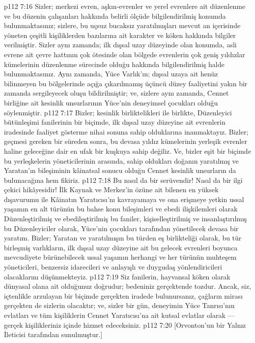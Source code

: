 \vs p112 7:16 Sizler; merkezi evren, aşkın\hyp{}evrenler ve yerel evrenlere ait düzenlenme ve bu düzenin çalışanları hakkında belirli ölçüde bilgilendirilmiş konumda bulunmaktasınız; sizlere, bu uçsuz bucaksız yaratılmışları mevcut an içerisinde yöneten çeşitli kişiliklerden bazılarına ait karakter ve köken hakkında bilgiler verilmiştir. Sizler aynı zamanda; ilk dışsal uzay düzeyinde olan konumda, asli evrene ait çevre hattının çok ötesinde olan bölgede evrenlerin çok geniş yıldızlar kümelerinin düzenlenme sürecinde olduğu hakkında bilgilendirilmiş halde bulunmaktasınız. Aynı zamanda, Yüce Varlık’ın; dışsal uzaya ait henüz bilinmeyen bu bölgelerinde açığa çıkarılmamış üçüncü düzey faaliyetini yakın bir zamanda sergileyecek oluşu bildirilmiştir; ve, sizlere aynı zamanda, Cennet birliğine ait kesinlik unsurlarının Yüce’nin deneyimsel çocukları olduğu söylenmiştir.
\vs p112 7:17 Bizler; kesinlik birliktelikleri ile birlikte, Düzenleyici bütünleşimi fanilerinin bir biçimde, ilk dışsal uzay düzeyine ait evrenlerin iradesinde faaliyet gösterme nihai sonuna sahip olduklarına inanmaktayız. Bizler; geçmesi gereken bir süreden sonra, bu devasa yıldız kümelerinin yerleşik evrenler haline geleceğine dair en ufak bir kuşkuya sahip değiliz. Ve, bizler eşit bir biçimde bu yerleşkelerin yöneticilerinin arasında, sahip oldukları doğanın yaratılmış ve Yaratan’ın bileşiminin kâinatsal sonucu olduğu Cennet kesinlik unsurların da bulunacağına hem fikiriz.
\vs p112 7:18 Bu nasıl da bir serüvendir! Nasıl da bir ilgi çekici hikâyesidir! İlk Kaynak ve Merkez’in özüne ait bilenen en yüksek dışavurumu ile Kâinatın Yaratıcısı’nı kavrayamaya ve ona erişmeye yetkin ussal yaşamın en alt türünün bu bahse konu bileşimleri ve ebedi ilişkilemleri olarak Düzenleştirilmiş ve ebedileştirilmiş bu faniler, kişiselleştirilmiş ve insanlaştırılmış bu Düzenleyiciler olarak, Yüce’nin çocukları tarafından yönetilecek devasa bir yaratım. Bizler; Yaratan ve yaratılmışın bu türden eş birlikteliği olarak, bu tür birleşmiş varlıkların, ilk dışsal uzay düzeyine ait bu gelecek evrenleri boyunca mevcudiyete bürünebilecek ussal yaşamın herhangi ve her türünün muhteşem yöneticileri, benzersiz idarecileri ve anlayışlı ve duygudaş yönlendiricileri olacaklarını düşünmekteyiz.
\vs p112 7:19 Siz fanilerin, hayvansal köken olarak dünyasal olana ait olduğunuz doğrudur; bedeniniz gerçektende tozdur. Ancak, siz, içtenlikle arzulayan bir biçimde gerçekten iradede bulunursanız, çağların mirası gerçekten de sizlerin olacaktır; ve, sizler bir gün, deneyimin Yüce Tanrısı’nın evlatları ve tüm kişiliklerin Cennet Yaratıcısı’na ait kutsal evlatlar olarak --- gerçek kişilikleriniz içinde hizmet edeceksiniz.
\vs p112 7:20 [Orvonton’un bir Yalnız İleticisi tarafından sunulmuştur.]
